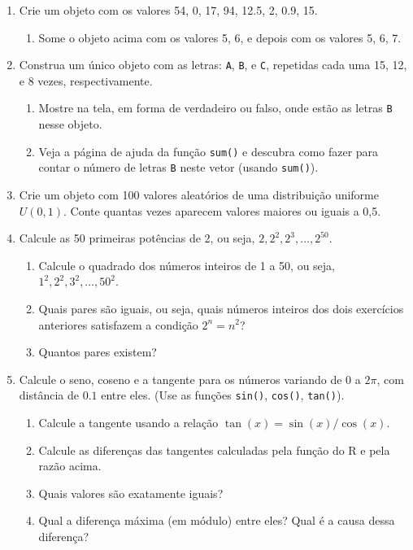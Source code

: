 \documentclass[10pt,a4paper]{book}
\providecommand{\tightlist}{%
  \setlength{\itemsep}{0pt}\setlength{\parskip}{0pt}}
\begin{document}
\begin{enumerate}
\def\labelenumi{\arabic{enumi}.}
\tightlist
\item
  Crie um objeto com os valores 54, 0, 17, 94, 12.5, 2, 0.9, 15.

  \begin{enumerate}
  \def\labelenumii{\alph{enumii}.}
  \tightlist
  \item
    Some o objeto acima com os valores 5, 6, e depois com os valores 5,
    6, 7.
  \end{enumerate}
\item
  Construa um único objeto com as letras: \texttt{A}, \texttt{B}, e
  \texttt{C}, repetidas cada uma 15, 12, e 8 vezes, respectivamente.

  \begin{enumerate}
  \def\labelenumii{\alph{enumii}.}
  \tightlist
  \item
    Mostre na tela, em forma de verdadeiro ou falso, onde estão as
    letras \texttt{B} nesse objeto.
  \item
    Veja a página de ajuda da função \texttt{sum()} e descubra como
    fazer para contar o número de letras \texttt{B} neste vetor (usando
    \texttt{sum()}).
  \end{enumerate}
\item
  Crie um objeto com 100 valores aleatórios de uma distribuição uniforme
  \(U(0,1)\). Conte quantas vezes aparecem valores maiores ou iguais a
  0,5.
\item
  Calcule as 50 primeiras potências de 2, ou seja,
  \(2, 2^2, 2^3,  \ldots, 2^{50}\).

  \begin{enumerate}
  \def\labelenumii{\alph{enumii}.}
  \tightlist
  \item
    Calcule o quadrado dos números inteiros de 1 a 50, ou seja,
    \(1^2, 2^2, 3^2, \ldots, 50^2\).
  \item
    Quais pares são iguais, ou seja, quais números inteiros dos dois
    exercícios anteriores satisfazem a condição \(2^n = n^2\)?
  \item
    Quantos pares existem?
  \end{enumerate}
\item
  Calcule o seno, coseno e a tangente para os números variando de \(0\)
  a \(2\pi\), com distância de \(0.1\) entre eles. (Use as funções
  \texttt{sin()}, \texttt{cos()}, \texttt{tan()}).

  \begin{enumerate}
  \def\labelenumii{\alph{enumii}.}
  \tightlist
  \item
    Calcule a tangente usando a relação \(\tan(x) = \sin(x)/\cos(x)\).
  \item
    Calcule as diferenças das tangentes calculadas pela função do R e
    pela razão acima.
  \item
    Quais valores são exatamente iguais?
  \item
    Qual a diferença máxima (em módulo) entre eles? Qual é a causa dessa
    diferença?
  \end{enumerate}
\end{enumerate}
\end{document}
